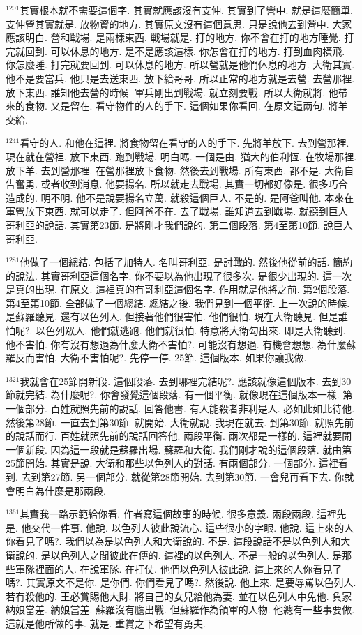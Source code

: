 \documentclass{book}
\begin{document}
$^{1201}$其實根本就不需要這個字.
其實就應該沒有支仲.
其實到了營中.
就是這麼簡單.
支仲營其實就是.
放物資的地方.
其實原文沒有這個意思.
只是說他去到營中.
大家應該明白.
營和戰場.
是兩樣東西.
戰場就是.
打的地方.
你不會在打的地方睡覺.
打完就回到.
可以休息的地方.
是不是應該這樣.
你怎會在打的地方.
打到血肉橫飛.
你怎麼睡.
打完就要回到.
可以休息的地方.
所以營就是他們休息的地方.
大衛其實.
他不是要當兵.
他只是去送東西.
放下給哥哥.
所以正常的地方就是去營.
去營那裡.
放下東西.
誰知他去營的時候.
軍兵剛出到戰場.
就立刻要戰.
所以大衛就將.
他帶來的食物.
又是留在.
看守物件的人的手下.
這個如果你看回.
在原文這兩句.
將羊交給.

$^{1241}$看守的人.
和他在這裡.
將食物留在看守的人的手下.
先將羊放下.
去到營那裡.
現在就在營裡.
放下東西.
跑到戰場.
明白嗎.
一個是由.
猶大的伯利恆.
在牧場那裡.
放下羊.
去到營那裡.
在營那裡放下食物.
然後去到戰場.
所有東西.
都不是.
大衛自告奮勇.
或者收到消息.
他要揚名.
所以就走去戰場.
其實一切都好像是.
很多巧合造成的.
明不明.
他不是說要揚名立萬.
就殺這個巨人.
不是的.
是阿爸叫他.
本來在軍營放下東西.
就可以走了.
但阿爸不在.
去了戰場.
誰知道去到戰場.
就聽到巨人哥利亞的說話.
其實第23節.
是將剛才我們說的.
第二個段落.
第4至第10節.
說巨人哥利亞.

$^{1281}$他做了一個總結.
包括了加特人.
名叫哥利亞.
是討戰的.
然後他從前的話.
簡約的說法.
其實哥利亞這個名字.
你不要以為他出現了很多次.
是很少出現的.
這一次是真的出現.
在原文.
這裡真的有哥利亞這個名字.
作用就是他將之前.
第2個段落.
第4至第10節.
全部做了一個總結.
總結之後.
我們見到一個平衡.
上一次說的時候.
是蘇羅聽見.
還有以色列人.
但接著他們很害怕.
他們很怕.
現在大衛聽見.
但是誰怕呢?.
以色列眾人.
他們就逃跑.
他們就很怕.
特意將大衛勾出來.
即是大衛聽到.
他不害怕.
你有沒有想過為什麼大衛不害怕?.
可能沒有想過.
有機會想想.
為什麼蘇羅反而害怕.
大衛不害怕呢?.
先停一停.
25節.
這個版本.
如果你讓我做.

$^{1321}$我就會在25節開新段.
這個段落.
去到哪裡完結呢?.
應該就像這個版本.
去到30節就完結.
為什麼呢?.
你會發覺這個段落.
有一個平衡.
就像現在這個版本一樣.
第一個部分.
百姓就照先前的說話.
回答他書.
有人能殺者非利是人.
必如此如此待他.
然後第28節.
一直去到第30節.
就開始.
大衛就說.
我現在就去.
到第30節.
就照先前的說話而行.
百姓就照先前的說話回答他.
兩段平衡.
兩次都是一樣的.
這裡就要開一個新段.
因為這一段就是蘇羅出場.
蘇羅和大衛.
我們剛才說的這個段落.
就由第25節開始.
其實是說.
大衛和那些以色列人的對話.
有兩個部分.
一個部分.
這裡看到.
去到第27節.
另一個部分.
就從第28節開始.
去到第30節.
一會兒再看下去.
你就會明白為什麼是那兩段.

$^{1361}$其實我一路示範給你看.
作者寫這個故事的時候.
很多意義.
兩段兩段.
這裡先是.
他交代一件事.
他說.
以色列人彼此說流心.
這些很小的字眼.
他說.
這上來的人你看見了嗎?.
我們以為是以色列人和大衛說的.
不是.
這段說話不是以色列人和大衛說的.
是以色列人之間彼此在傳的.
這裡的以色列人.
不是一般的以色列人.
是那些軍隊裡面的人.
在說軍隊.
在打仗.
他們以色列人彼此說.
這上來的人你看見了嗎?.
其實原文不是你.
是你們.
你們看見了嗎?.
然後說.
他上來.
是要辱罵以色列人.
若有殺他的.
王必賞賜他大財.
將自己的女兒給他為妻.
並在以色列人中免他.
負家納娘當差.
納娘當差.
蘇羅沒有膽出戰.
但蘇羅作為領軍的人物.
他總有一些事要做.
這就是他所做的事.
就是.
重賞之下希望有勇夫.
\end{document}
